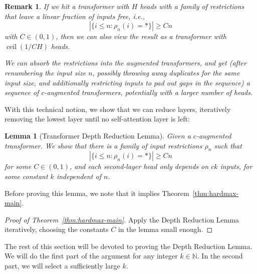 \documentclass[11pt,a4paper]{article}
\newcounter{theorem}
\newtheorem{remark}[theorem]{Remark}
\newtheorem{lemma}[theorem]{Lemma}
\begin{document}
\begin{remark}
If we hit a transformer with $H$ heads with a family of restrictions that leave a linear fraction of inputs free, i.e.,
\begin{equation}
|\{i \leq n: \rho_n(i) = *\}| \geq Cn
\end{equation}
with $C \in (0,1)$, then we can also view the result as a transformer with $\operatorname{ceil}(1/C H)$ heads.

We can absorb the restrictions into the augmented transformers, and get (after renumbering the input size $n$, possibly throwing away duplicates for the same input size, and additionally restricting inputs to pad out gaps in the sequence) a sequence of $c$-augmented transformers, potentially with a larger number of heads.
\end{remark}
With this technical notion, we show that we can reduce layers, iteratively removing the lowest layer until no self-attention layer is left:
\begin{lemma}[Transformer Depth Reduction Lemma]
Given a $c$-augmented transformer. %
We show that there is a family of input restrictions $\rho_n$ %
such that
\begin{equation}
|\{i \leq n: \rho_n(i) = *\}| \geq Cn %
\end{equation}
for some $C \in (0,1)$,
and each second-layer head only depends on $ck$ inputs, for some constant $k$ independent of $n$.
\end{lemma}
Before proving this lemma, we note that it implies Theorem~\ref{thm:hardmax-main}.
\begin{proof}[Proof of Theorem~\ref{thm:hardmax-main}]
Apply the Depth Reduction Lemma iteratively, choosing the constants $C$ in the lemma small enough.
\end{proof}


The rest of this section will be devoted to proving the Depth Reduction Lemma.
We will do the first part of the argument for any integer $k \in \mathbb{N}$.
In the second part, we will select a sufficiently large $k$.
\end{document}
